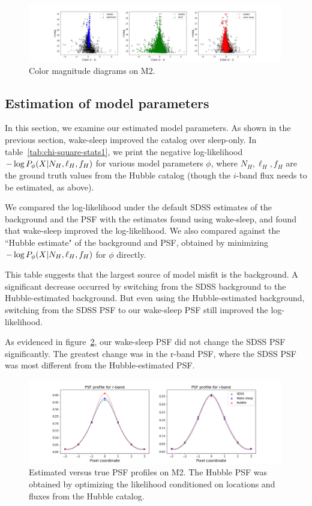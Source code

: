 \begin{figure}[h]
    \centering
    \includegraphics[width=0.99\textwidth]{figures/cmd.png}
    \caption{Color magnitude diagrams on M2. }
    \label{fig:cmd_m2}
\end{figure}


\subsection{Estimation of model parameters}
\label{sec:results_model_params}
In this section, we examine our estimated model parameters. As shown in the previous section, wake-sleep improved the catalog over sleep-only. In table~\ref{tab:chi-square-stats1}, we
print the negative log-likelihood $- \log P_\phi(X | N_{H}, \ell_{H}, f_{H})$ for various model parameters $\phi$, where $N_{H}, \ell_{H}, f_{H}$ are the ground truth
values from the Hubble catalog (though the $i$-band flux needs to be estimated, as above). 

We compared the log-likelihood under the default SDSS estimates of the background and the PSF with the estimates found using wake-sleep, and found that wake-sleep improved the log-likelihood. We also compared against the ``Hubble estimate" of the background and PSF, obtained by minimizing 
$- \log P_\phi(X | N_{H}, \ell_{H}, f_{H})$ for $\phi$ directly. 

This table suggests that the largest source of model misfit is the background. A significant decrease occurred by switching from the SDSS background to the Hubble-estimated background. 
But even using the Hubble-estimated background, switching from the SDSS PSF to our wake-sleep PSF still improved the log-likelihood. 



As evidenced in figure~\ref{fig:psf_profiles}, our wake-sleep PSF did not change the SDSS PSF significantly. The greatest change was in the r-band PSF, where the SDSS PSF was most different from the Hubble-estimated PSF. 

\begin{figure}[h]
    \centering
    \includegraphics[width=0.99\textwidth]{figures/psf_profiles.png}
    \caption{Estimated versus true PSF profiles on M2. The Hubble PSF was
    obtained by optimizing the likelihood conditioned on locations and fluxes
    from the Hubble catalog. }
    \label{fig:psf_profiles}
\end{figure}


